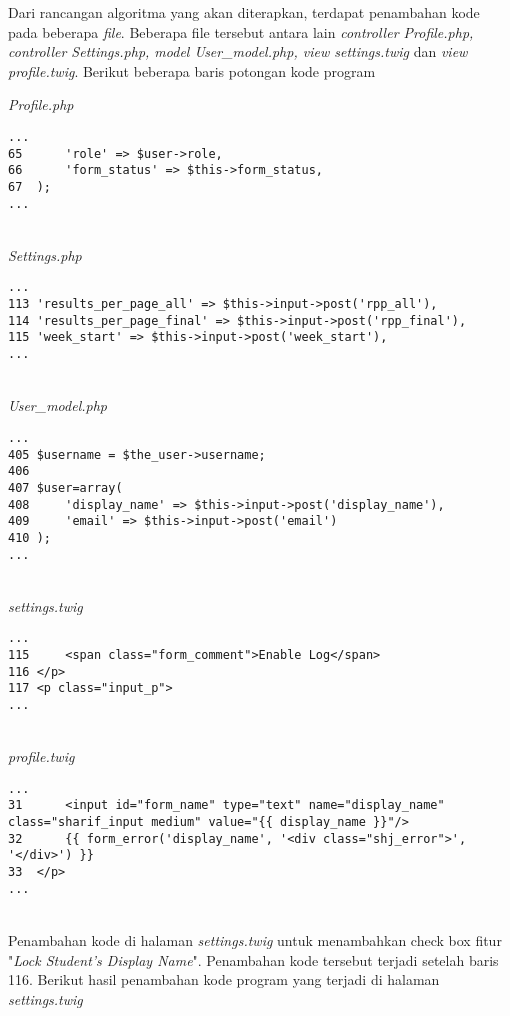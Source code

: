 Dari rancangan algoritma yang akan diterapkan, terdapat penambahan kode pada beberapa \textit{file}. Beberapa file tersebut antara lain \textit{controller Profile.php, controller Settings.php, model User\_model.php, view settings.twig} dan \textit{view profile.twig}.
Berikut beberapa baris potongan kode program

\textit{Profile.php}
\begin{lstlisting}[basicstyle=\ttfamily, frame=single,
columns=fullflexible, keepspaces=true, breaklines=true]
...
65		'role' => $user->role,
66		'form_status' => $this->form_status,
67	);
...
\end{lstlisting}
~\\
\textit{Settings.php}
\begin{lstlisting}[basicstyle=\ttfamily, frame=single,
columns=fullflexible, keepspaces=true, breaklines=true]
...
113	'results_per_page_all' => $this->input->post('rpp_all'),
114	'results_per_page_final' => $this->input->post('rpp_final'),
115	'week_start' => $this->input->post('week_start'),
...
\end{lstlisting}
~\\
\textit{User\_model.php}
\begin{lstlisting}[basicstyle=\ttfamily, frame=single,
columns=fullflexible, keepspaces=true, breaklines=true]
...
405	$username = $the_user->username;
406
407	$user=array(
408		'display_name' => $this->input->post('display_name'),
409		'email' => $this->input->post('email')
410	);
...
\end{lstlisting}
~\\
\textit{settings.twig}
\begin{lstlisting}[basicstyle=\ttfamily, frame=single,
columns=fullflexible, keepspaces=true, breaklines=true]
...
115		<span class="form_comment">Enable Log</span>
116	</p>
117	<p class="input_p">
...
\end{lstlisting}
~\\
\textit{profile.twig}
\begin{lstlisting}[basicstyle=\ttfamily, frame=single,
columns=fullflexible, keepspaces=true, breaklines=true]
...
31		<input id="form_name" type="text" name="display_name" class="sharif_input medium" value="{{ display_name }}"/>
32		{{ form_error('display_name', '<div class="shj_error">', '</div>') }}
33	</p>
...
\end{lstlisting}
~\\
Penambahan kode di halaman \textit{settings.twig} untuk menambahkan check box fitur "\textit{Lock Student's Display Name}". Penambahan kode tersebut terjadi setelah baris 116. Berikut hasil penambahan kode program yang terjadi di halaman \textit{settings.twig}

